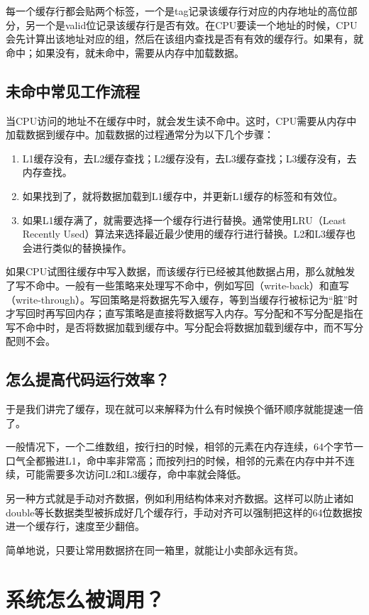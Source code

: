 \documentclass[../main.tex]{subfiles}
\begin{document}
每一个缓存行都会贴两个标签，一个是tag记录该缓存行对应的内存地址的高位部分，另一个是valid位记录该缓存行是否有效。在CPU要读一个地址的时候，CPU会先计算出该地址对应的组，然后在该组内查找是否有有效的缓存行。如果有，就命中；如果没有，就未命中，需要从内存中加载数据。

\subsection{未命中常见工作流程}

当CPU访问的地址不在缓存中时，就会发生读不命中。这时，CPU需要从内存中加载数据到缓存中。加载数据的过程通常分为以下几个步骤：
\begin{enumerate}
  \item L1缓存没有，去L2缓存查找；L2缓存没有，去L3缓存查找；L3缓存没有，去内存查找。
  \item 如果找到了，就将数据加载到L1缓存中，并更新L1缓存的标签和有效位。
  \item 如果L1缓存满了，就需要选择一个缓存行进行替换。通常使用LRU（Least Recently Used）算法来选择最近最少使用的缓存行进行替换。L2和L3缓存也会进行类似的替换操作。
\end{enumerate}

如果CPU试图往缓存中写入数据，而该缓存行已经被其他数据占用，那么就触发了写不命中。一般有一些策略来处理写不命中，例如写回（write-back）和直写（write-through）。写回策略是将数据先写入缓存，等到当缓存行被标记为“脏”时才写回时再写回内存；直写策略是直接将数据写入内存。写分配和不写分配是指在写不命中时，是否将数据加载到缓存中。写分配会将数据加载到缓存中，而不写分配则不会。

\subsection{怎么提高代码运行效率？}
于是我们讲完了缓存，现在就可以来解释为什么有时候换个循环顺序就能提速一倍了。

一般情况下，一个二维数组，按行扫的时候，相邻的元素在内存连续，64个字节一口气全都搬进L1，命中率非常高；而按列扫的时候，相邻的元素在内存中并不连续，可能需要多次访问L2和L3缓存，命中率就会降低。

另一种方式就是手动对齐数据，例如利用结构体来对齐数据。这样可以防止诸如double等长数据类型被拆成好几个缓存行，手动对齐可以强制把这样的64位数据按进一个缓存行，速度至少翻倍。

简单地说，只要让常用数据挤在同一箱里，就能让小卖部永远有货。

\section{系统怎么被调用？}
\end{document}
